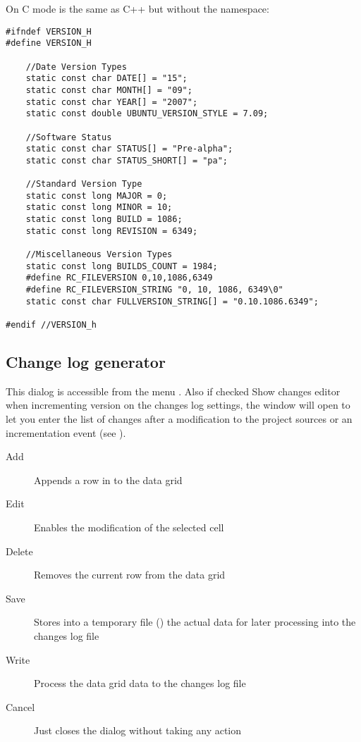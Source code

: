 On C mode is the same as C++ but without the namespace:

\begin{lstlisting}
#ifndef VERSION_H
#define VERSION_H

	//Date Version Types
	static const char DATE[] = "15";
	static const char MONTH[] = "09";
	static const char YEAR[] = "2007";
	static const double UBUNTU_VERSION_STYLE = 7.09;

	//Software Status
	static const char STATUS[] = "Pre-alpha";
	static const char STATUS_SHORT[] = "pa";

	//Standard Version Type
	static const long MAJOR = 0;
	static const long MINOR = 10;
	static const long BUILD = 1086;
	static const long REVISION = 6349;

	//Miscellaneous Version Types
	static const long BUILDS_COUNT = 1984;
	#define RC_FILEVERSION 0,10,1086,6349
	#define RC_FILEVERSION_STRING "0, 10, 1086, 6349\0"
	static const char FULLVERSION_STRING[] = "0.10.1086.6349";

#endif //VERSION_h
\end{lstlisting}

\subsection{Change log generator}

This dialog is accessible from the menu . Also if checked Show changes editor when incrementing version on the changes log settings, the window will open to let you enter the list of changes after a modification to the project sources or an incrementation event (see ).



\begin{description}
\item[Add] Appends a row in to the data grid
\item[Edit] Enables the modification of the selected cell
\item[Delete] Removes the current row from the data grid
\item[Save] Stores into a temporary file () the actual data for later processing into the changes log file
\item[Write] Process the data grid data to the changes log file
\item[Cancel] Just closes the dialog without taking any action
\end{description}

